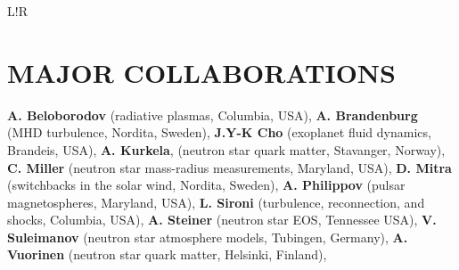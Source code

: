 \documentclass[letterpaper, onecolumn, 11pt]{article}
\newcommand\VRule{\color{lightgray}\vrule width 0.5pt}
\begin{document}
\begin{tabular}{L!{\VRule}R}
\end{tabular}


\vspace{-0.3cm}
\section*{MAJOR COLLABORATIONS}
\vspace{-0.3cm}
\textbf{A. Beloborodov} (radiative plasmas, Columbia, USA), 
\textbf{A. Brandenburg} (MHD turbulence, Nordita, Sweden), 
\textbf{J.Y-K Cho} (exoplanet fluid dynamics, Brandeis, USA), 
\textbf{A. Kurkela}, (neutron star quark matter, Stavanger, Norway),  
\textbf{C. Miller} (neutron star mass-radius measurements, Maryland, USA), 
\textbf{D. Mitra} (switchbacks in the solar wind, Nordita, Sweden), 
\textbf{A. Philippov} (pulsar magnetospheres, Maryland, USA),  
\textbf{L. Sironi} (turbulence, reconnection, and shocks, Columbia, USA),  
\textbf{A. Steiner} (neutron star EOS, Tennessee USA), 
\textbf{V. Suleimanov} (neutron star atmosphere models, Tubingen, Germany), 
\textbf{A. Vuorinen} (neutron star quark matter, Helsinki, Finland), 


\clearpage

\renewcommand\refname{\phantom{bla}}

\end{document}
